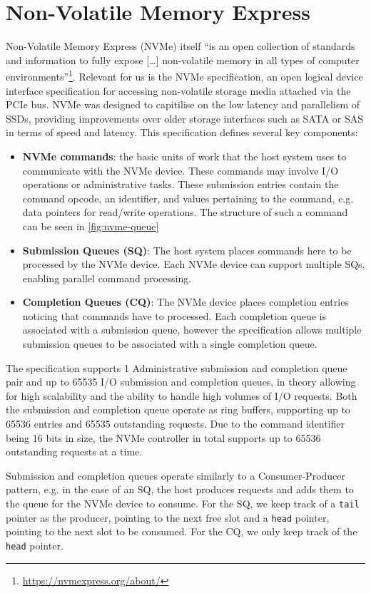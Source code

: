 \section{Non-Volatile Memory Express}
Non-Volatile Memory Express (NVMe) itself ``is an open collection of standards and information to fully expose [\ldots] non-volatile memory in all types of computer environments''\footnote{\url{https://nvmexpress.org/about/}}. Relevant for us is the NVMe specification, an open logical device interface specification for accessing non-volatile storage media attached via the PCIe bus. NVMe was designed to capitilise on the low latency and parallelism of SSDs, providing improvements over older storage interfaces such as SATA or SAS in terms of speed and latency. This specification defines several key components:

\begin{itemize}
    \item \textbf{NVMe commands}: the basic units of work that the host system uses to communicate with the NVMe device. These commands may involve I/O operations or administrative tasks. These submission entries contain the command opcode, an identifier, and values pertaining to the command, e.g. data pointers for read/write operations. The structure of such a command can be seen in \autoref{fig:nvme-queue}
    \item \textbf{Submission Queues (SQ)}: The host system places commands here to be processed by the NVMe device. Each NVMe device can support multiple SQs, enabling parallel command processing.
    \item \textbf{Completion Queues (CQ)}: The NVMe device places completion entries noticing that commands have to processed. Each completion queue is associated with a submission queue, however the specification allows multiple submission queues to be associated with a single completion queue.
\end{itemize}

The specification supports 1 Administrative submission and completion queue pair and up to 65535 I/O submission and completion queues, in theory allowing for high scalability and the ability to handle high volumes of I/O requests. Both the submission and completion queue operate as ring buffers, supporting up to 65536 entries and 65535 outstanding requests. Due to the command identifier being 16 bits in size, the NVMe controller in total supports up to 65536 outstanding requests at a time.

Submission and completion queues operate similarly to a Consumer-Producer pattern, e.g. in the case of an SQ, the host produces requests and adds them to the queue for the NVMe device to consume. For the SQ, we keep track of a \texttt{tail} pointer as the producer, pointing to the next free slot and a \texttt{head} pointer, pointing to the next slot to be consumed. For the CQ, we only keep track of the \texttt{head} pointer.

